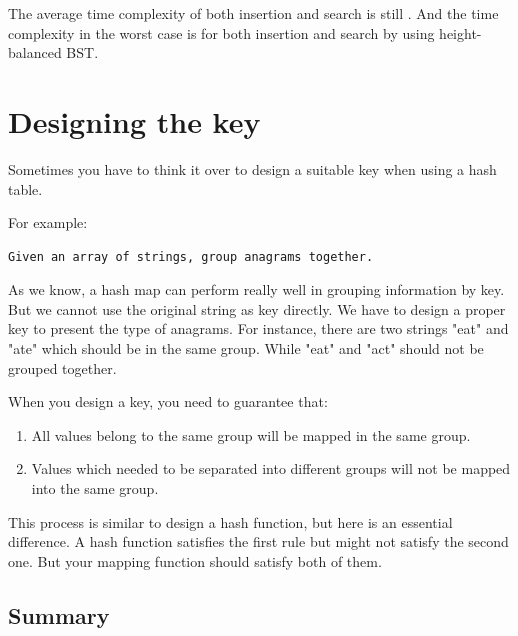 The average time complexity of both insertion and search is still .
And the time complexity in the worst case is  for both insertion and search by using height-balanced BST.



\section{Designing the key}

Sometimes you have to think it over to design a suitable key when using a hash table.

For example:
\begin{tcolorbox}
\begin{verbatim}
Given an array of strings, group anagrams together.
\end{verbatim}  
\end{tcolorbox}


As we know, a hash map can perform really well in grouping information by key.
But we cannot use the original string as key directly.
We have to design a proper key to present the type of anagrams.
For instance, there are two strings "eat" and "ate" which should be in the same group.
While "eat" and "act" should not be grouped together.


When you design a key, you need to guarantee that:
\begin{enumerate}
\item All values belong to the same group will be mapped in the same group.
\item Values which needed to be separated into different groups will not be mapped into the same group.
\end{enumerate}


This process is similar to design a hash function, but here is an essential difference.
A hash function satisfies the first rule but might not satisfy the second one.
But your mapping function should satisfy both of them.




\subsection{Summary}

